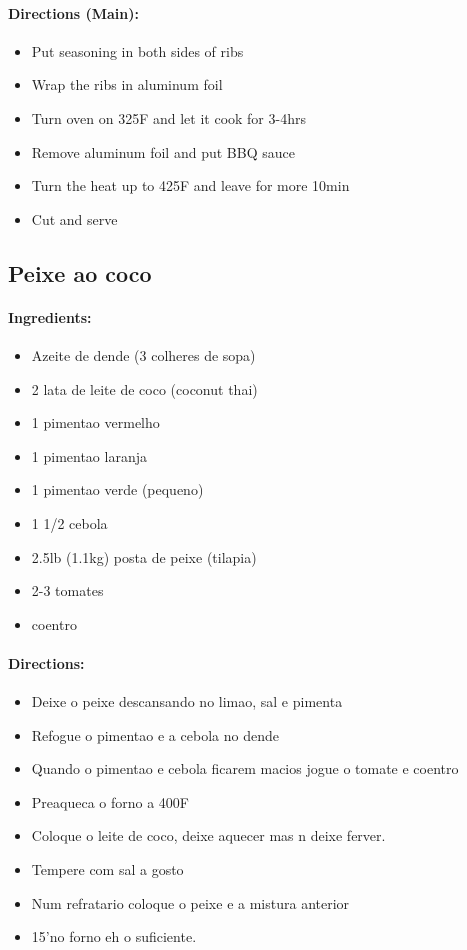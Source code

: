 \documentclass{article}
\begin{document}
\paragraph{Directions (Main):}
\begin{itemize}
    \item Put seasoning in both sides of ribs
    \item Wrap the ribs in aluminum foil
    \item Turn oven on 325F and let it cook for 3-4hrs
    \item Remove aluminum foil and put BBQ sauce
    \item Turn the heat up to 425F and leave for more 10min
    \item Cut and serve
\end{itemize} 

\subsection{Peixe ao coco}

\paragraph{Ingredients:}
\begin{itemize}
    \item Azeite de dende (3 colheres de sopa)
    \item 2 lata de leite de coco (coconut thai)
    \item 1 pimentao vermelho
    \item 1 pimentao laranja
    \item 1 pimentao verde (pequeno)
    \item 1 1/2 cebola
    \item 2.5lb (1.1kg) posta de peixe (tilapia)
    \item 2-3 tomates
    \item coentro
\end{itemize}

\paragraph{Directions:}
\begin{itemize}
    \item Deixe o peixe descansando no limao, sal e pimenta
    \item Refogue o pimentao e a cebola no dende
    \item Quando o pimentao e cebola ficarem macios jogue o tomate e coentro
    \item Preaqueca o forno a 400F
    \item Coloque o leite de coco, deixe aquecer mas n deixe ferver.
    \item Tempere com sal a gosto
    \item Num refratario coloque o peixe e a mistura anterior
    \item 15'no forno eh o suficiente.
\end{itemize}
\end{document}
